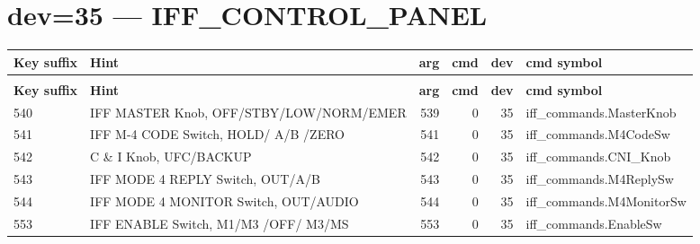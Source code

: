 \documentclass[10pt,a4paper]{article}
\begin{document}
\section{dev=35 — IFF\_CONTROL\_PANEL}
\begin{longtable}{>{\ttfamily\small}p{38mm} >{\small}p{72mm} r r r >{\ttfamily\small}p{48mm}}
\toprule
\textbf{Key suffix} & \textbf{Hint} & \textbf{arg} & \textbf{cmd} & \textbf{dev} & \textbf{cmd symbol} \\
\midrule
\endfirsthead
\multicolumn{6}{l}{\small\itshape continued\ldots}\\
\toprule
\textbf{Key suffix} & \textbf{Hint} & \textbf{arg} & \textbf{cmd} & \textbf{dev} & \textbf{cmd symbol} \\
\midrule
\endhead
\bottomrule
\endfoot
\rowcolor{rowodd}
  540 & IFF MASTER Knob, OFF/STBY/LOW/NORM/EMER & 539 & 0 & 35 & iff\_commands.MasterKnob \\
  541 & IFF M-4 CODE Switch, HOLD/ A/B /ZERO & 541 & 0 & 35 & iff\_commands.M4CodeSw \\
\rowcolor{rowodd}
  542 & C \& I Knob, UFC/BACKUP & 542 & 0 & 35 & iff\_commands.CNI\_Knob \\
  543 & IFF MODE 4 REPLY Switch, OUT/A/B & 543 & 0 & 35 & iff\_commands.M4ReplySw \\
\rowcolor{rowodd}
  544 & IFF MODE 4 MONITOR Switch, OUT/AUDIO & 544 & 0 & 35 & iff\_commands.M4MonitorSw \\
  553 & IFF ENABLE Switch, M1/M3 /OFF/ M3/MS & 553 & 0 & 35 & iff\_commands.EnableSw \\
\end{longtable}
\end{document}
